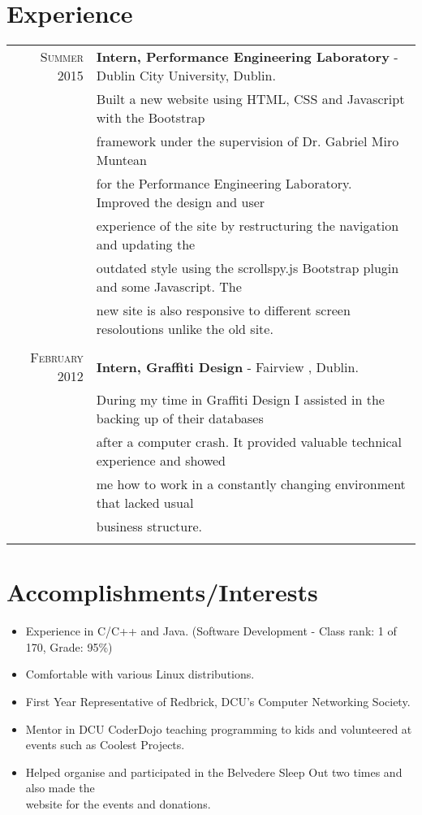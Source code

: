 \documentclass[a4paper,10pt]{article}
\begin{document}
\section{\textbf{Experience}}
\begin{tabular}{rl}	
\textsc{Summer} 2015 & \textbf{Intern, Performance Engineering Laboratory} - Dublin City University, Dublin.\\
& Built a new website using HTML, CSS and Javascript with the Bootstrap \\
& framework under the supervision of Dr. Gabriel Miro Muntean \\
& for the Performance Engineering Laboratory.
Improved the design and user \\
& experience of the site by restructuring the navigation and updating the \\
& outdated style using the scrollspy.js Bootstrap plugin and some Javascript. The \\
& new site is also responsive to different screen resoloutions unlike the old site.\\&\\

\textsc{February} 2012 & \textbf{Intern, Graffiti Design} - Fairview , Dublin.\\
& During my time in Graffiti Design I assisted in the backing up of their databases\\
& after a computer crash. It provided valuable technical experience and showed \\
& me how to work in a constantly changing environment that lacked usual\\
& business structure.\\&\\
\end{tabular}

\section{\textbf{Accomplishments/Interests}}
\begin{itemize}
  \item Experience in C/C++ and Java. (Software Development - Class rank: 1 of 170, Grade: 95\%) 
  \item Comfortable with various Linux distributions.
  \item First Year Representative of Redbrick, DCU’s Computer Networking Society.
  \item Mentor in DCU CoderDojo teaching programming to kids and volunteered at events such as Coolest Projects.
  \item Helped organise and participated in the Belvedere Sleep Out two times and also made the \\ website for the events and donations. \end{itemize}
\end{document}

